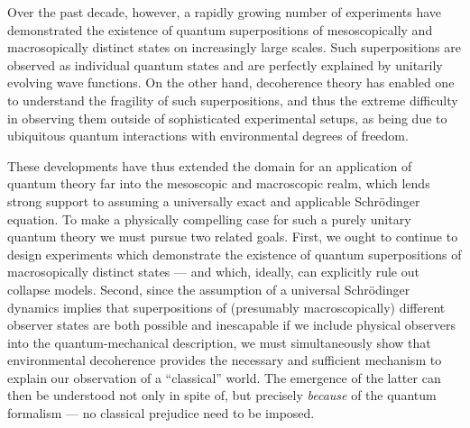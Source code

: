 \documentclass[12pt,aps,floatfix,amsmath,amssymb,showpacs,nofootinbib]{revtex4-2}
\begin{document}
Over the past decade, however, a rapidly growing number of experiments
have demonstrated the existence of quantum superpositions of
mesoscopically and macrosopically distinct states on increasingly
large scales. Such superpositions are observed as individual quantum
states and are perfectly explained by unitarily evolving wave
functions.  On the other hand, decoherence theory
\cite{Zeh:1970:yt,Zeh:1973:wq,Zurek:1981:dd,Zurek:2002:ii,Joos:2003:jh,Schlosshauer:2003:tv}
has enabled one to understand the fragility of such superpositions,
and thus the extreme difficulty in observing them outside of
sophisticated experimental setups, as being due to ubiquitous quantum
interactions with environmental degrees of freedom.

These developments have thus extended the domain for an application of
quantum theory far into the mesoscopic and macroscopic realm, which
lends strong support to assuming a universally exact and applicable
Schr\"odinger equation. To make a physically compelling case for such
a purely unitary quantum theory we must pursue two related goals.
First, we ought to continue to design experiments which demonstrate
the existence of quantum superpositions of macrosopically distinct
states --- and which, ideally, can explicitly rule out collapse
models. Second, since the assumption of a universal Schr\"odinger
dynamics implies that superpositions of (presumably macroscopically)
different observer states are both possible and inescapable if we
include physical observers into the quantum-mechanical description, we
must simultaneously show that environmental decoherence provides the
necessary and sufficient mechanism to explain our observation of a
``classical'' world. The emergence of the latter can then be
understood not only in spite of, but precisely {\em because} of the
quantum formalism --- no classical prejudice need to be imposed.
\end{document}
